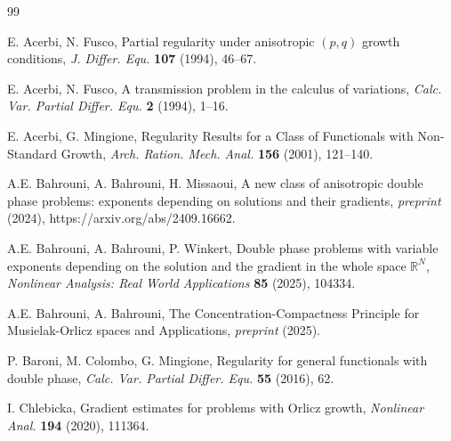 \documentclass[10pt,reqno]{amsart}
\newcommand *\w{^\wedge}
\theoremstyle{definition}
\numberwithin{equation}{section}
\begin{document}
\begin{thebibliography}{99}
{\small

E. Acerbi, N. Fusco, 
Partial regularity under anisotropic \((p,q)\) growth conditions, 
{\it J. Differ. Equ.} \textbf{107} (1994), 46–67.

E. Acerbi, N. Fusco, 
A transmission problem in the calculus of variations, 
{\it Calc. Var. Partial Differ. Equ.} \textbf{2} (1994), 1–16.


E. Acerbi, G. Mingione,  
Regularity Results for a Class of Functionals with Non-Standard Growth, \textit{Arch. Ration. Mech. Anal.} \textbf{156} (2001), 121–140.


A.E. Bahrouni, A. Bahrouni, H. Missaoui, A new class of anisotropic double phase problems: exponents depending on solutions and their gradients, \textit{preprint} (2024), https://arxiv.org/abs/2409.16662.

A.E. Bahrouni, A. Bahrouni, P. Winkert, Double phase problems with variable exponents depending on the solution and the gradient in the whole space $\mathbb{R}^N$, \textit{Nonlinear Analysis: Real World Applications} \textbf{85} (2025), 104334.

A.E. Bahrouni, A. Bahrouni, The Concentration-Compactness Principle for Musielak-Orlicz spaces and Applications, \textit{preprint} (2025).


P. Baroni, M. Colombo, G. Mingione, 
Regularity for general functionals with double phase, 
{\it Calc. Var. Partial Differ. Equ.} \textbf{55} (2016), 62.




I. Chlebicka,  
Gradient estimates for problems with Orlicz growth,  
{\it Nonlinear Anal.} \textbf{194} (2020), 111364.

}
\end{thebibliography}
\end{document}
